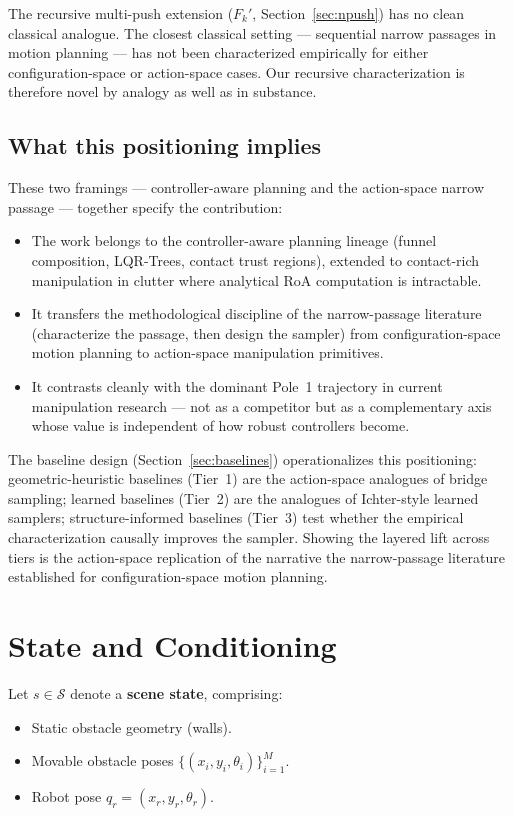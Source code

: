 \documentclass[11pt]{article}
\begin{document}
The recursive multi-push extension ($F_k'$, Section~\ref{sec:npush}) has no
clean classical analogue. The closest classical setting --- sequential
narrow passages in motion planning --- has not been characterized empirically
for either configuration-space or action-space cases. Our recursive
characterization is therefore novel by analogy as well as in substance.

\subsection{What this positioning implies}

These two framings --- controller-aware planning and the action-space narrow
passage --- together specify the contribution:
\begin{itemize}[leftmargin=2em,itemsep=0pt]
  \item The work belongs to the controller-aware planning lineage (funnel
        composition, LQR-Trees, contact trust regions), extended to
        contact-rich manipulation in clutter where analytical RoA computation
        is intractable.
  \item It transfers the methodological discipline of the narrow-passage
        literature (characterize the passage, then design the sampler) from
        configuration-space motion planning to action-space manipulation
        primitives.
  \item It contrasts cleanly with the dominant Pole~1 trajectory in current
        manipulation research --- not as a competitor but as a complementary
        axis whose value is independent of how robust controllers become.
\end{itemize}

The baseline design (Section~\ref{sec:baselines}) operationalizes this
positioning: geometric-heuristic baselines (Tier~1) are the action-space
analogues of bridge sampling; learned baselines (Tier~2) are the analogues of
Ichter-style learned samplers; structure-informed baselines (Tier~3) test
whether the empirical characterization causally improves the sampler. Showing
the layered lift across tiers is the action-space replication of the
narrative the narrow-passage literature established for configuration-space
motion planning.

\section{State and Conditioning}

Let $s \in \mathcal{S}$ denote a \textbf{scene state}, comprising:
\begin{itemize}[leftmargin=2em,itemsep=0pt]
  \item Static obstacle geometry (walls).
  \item Movable obstacle poses $\{(x_i, y_i, \theta_i)\}_{i=1}^M$.
  \item Robot pose $q_r = (x_r, y_r, \theta_r)$.
\end{itemize}
\end{document}
